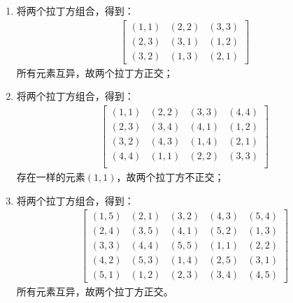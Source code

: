 \begin{solution}
   \begin{enumerate}
      \item 将两个拉丁方组合，得到：
      \begin{align*}
         \left[\begin{matrix}
             (1,1)&(2,2)&(3,3)\\
             (2,3)&(3,1)&(1,2)\\
             (3,2)&(1,3)&(2,1)
         \end{matrix}\right]
     \end{align*}
     所有元素互异，故两个拉丁方正交；
      \item 将两个拉丁方组合，得到：
      \begin{align*}
         \left[\begin{matrix}
             (1,1)&(2,2)&(3,3)&(4,4)\\
             (2,3)&(3,4)&(4,1)&(1,2)\\
             (3,2)&(4,3)&(1,4)&(2,1)\\
             (4,4)&(1,1)&(2,2)&(3,3)\\
         \end{matrix}\right]
     \end{align*}
     存在一样的元素$(1,1)$，故两个拉丁方不正交；
      \item 将两个拉丁方组合，得到：
      \begin{align*}
         \left[\begin{matrix}
             (1,5)&(2,1)&(3,2)&(4,3)&(5,4)\\
             (2,4)&(3,5)&(4,1)&(5,2)&(1,3)\\
             (3,3)&(4,4)&(5,5)&(1,1)&(2,2)\\
             (4,2)&(5,3)&(1,4)&(2,5)&(3,1)\\
             (5,1)&(1,2)&(2,3)&(3,4)&(4,5)
         \end{matrix}\right]
     \end{align*}
     所有元素互异，故两个拉丁方正交。
   \end{enumerate}
\end{solution}